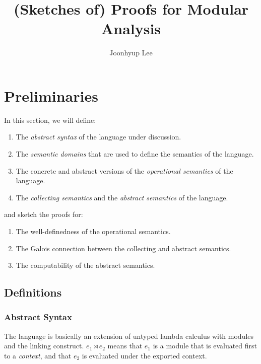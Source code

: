 \documentclass{article}
\title{(Sketches of) Proofs for Modular Analysis}
\author{Joonhyup Lee}
\theoremstyle{definition}
\newcommand*{\link}[2]{{#1}\rtimes{#2}}
\begin{document}
\maketitle

\section{Preliminaries}
In this section, we will define:
\begin{enumerate}
  \item The \emph{abstract syntax} of the language under discussion.
  \item The \emph{semantic domains} that are used to define the semantics of the language.
  \item The concrete and abstract versions of the \emph{operational semantics} of the language.
  \item The \emph{collecting semantics} and the \emph{abstract semantics} of the language.
\end{enumerate}
and sketch the proofs for:
\begin{enumerate}
  \item The well-definedness of the operational semantics.
  \item The Galois connection between the collecting and abstract semantics.
  \item The computability of the abstract semantics.
\end{enumerate}

\subsection{Definitions}
\subsubsection{Abstract Syntax}

The language is basically an extension of untyped lambda calculus with modules and the linking construct.
$\link{e_1}{e_2}$ means that $e_1$ is a module that is evaluated first to a \emph{context}, and that $e_2$ is evaluated under the exported context.
\end{document}
